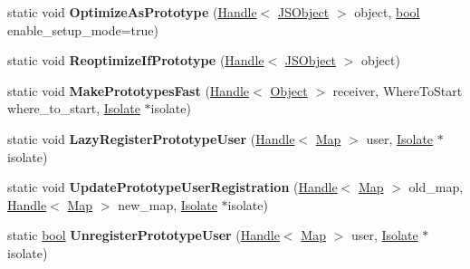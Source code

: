 \begin{DoxyCompactItemize}
\mbox{\label{classv8_1_1internal_1_1JSObject_ace30a53fa8cd5c3ae0760d490462ba22}} 
static void {\bfseries Optimize\+As\+Prototype} (\mbox{\hyperlink{classv8_1_1internal_1_1Handle}{Handle}}$<$ \mbox{\hyperlink{classv8_1_1internal_1_1JSObject}{J\+S\+Object}} $>$ object, \mbox{\hyperlink{classbool}{bool}} enable\+\_\+setup\+\_\+mode=true)
\item 
\mbox{\label{classv8_1_1internal_1_1JSObject_a342b5c9cabbf740064cf94830b92b330}} 
static void {\bfseries Reoptimize\+If\+Prototype} (\mbox{\hyperlink{classv8_1_1internal_1_1Handle}{Handle}}$<$ \mbox{\hyperlink{classv8_1_1internal_1_1JSObject}{J\+S\+Object}} $>$ object)
\item 
\mbox{\label{classv8_1_1internal_1_1JSObject_a8f0ee32ce7c1027bf0e9df29a29dc798}} 
static void {\bfseries Make\+Prototypes\+Fast} (\mbox{\hyperlink{classv8_1_1internal_1_1Handle}{Handle}}$<$ \mbox{\hyperlink{classv8_1_1internal_1_1Object}{Object}} $>$ receiver, Where\+To\+Start where\+\_\+to\+\_\+start, \mbox{\hyperlink{classv8_1_1internal_1_1Isolate}{Isolate}} $\ast$isolate)
\item 
\mbox{\label{classv8_1_1internal_1_1JSObject_a149520fb4af4a58921f89c484ff42c37}} 
static void {\bfseries Lazy\+Register\+Prototype\+User} (\mbox{\hyperlink{classv8_1_1internal_1_1Handle}{Handle}}$<$ \mbox{\hyperlink{classv8_1_1internal_1_1Map}{Map}} $>$ user, \mbox{\hyperlink{classv8_1_1internal_1_1Isolate}{Isolate}} $\ast$isolate)
\item 
\mbox{\label{classv8_1_1internal_1_1JSObject_a483a05c02334b9ac2bf7a5a392e4fe33}} 
static void {\bfseries Update\+Prototype\+User\+Registration} (\mbox{\hyperlink{classv8_1_1internal_1_1Handle}{Handle}}$<$ \mbox{\hyperlink{classv8_1_1internal_1_1Map}{Map}} $>$ old\+\_\+map, \mbox{\hyperlink{classv8_1_1internal_1_1Handle}{Handle}}$<$ \mbox{\hyperlink{classv8_1_1internal_1_1Map}{Map}} $>$ new\+\_\+map, \mbox{\hyperlink{classv8_1_1internal_1_1Isolate}{Isolate}} $\ast$isolate)
\item 
\mbox{\label{classv8_1_1internal_1_1JSObject_a6fc204aeda743e38eb48d8ccd3312db8}} 
static \mbox{\hyperlink{classbool}{bool}} {\bfseries Unregister\+Prototype\+User} (\mbox{\hyperlink{classv8_1_1internal_1_1Handle}{Handle}}$<$ \mbox{\hyperlink{classv8_1_1internal_1_1Map}{Map}} $>$ user, \mbox{\hyperlink{classv8_1_1internal_1_1Isolate}{Isolate}} $\ast$isolate)

\end{DoxyCompactItemize}
